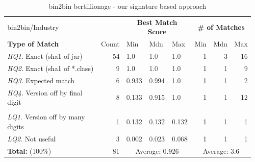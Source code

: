 \begin{table}[h]
  \centering
\begin{tabular}[htbp]{l|r|lll|rrr}
  bin2bin/Industry           &              & \multicolumn{3}{c|}{\textbf{Best Match Score}}  & \multicolumn{3}{c}{\textbf{\# of Matches}} \\
  \textbf{Type of Match}     & Count        & Min   & Mdn    & Max   & Min  & Mdn  & Max  \\
  \hline
  \emph{HQ1.} Exact (sha1 of jar)        & 54           & 1.0   & 1.0    & 1.0   & 1    & 3    & 16   \\
  \emph{HQ2.} Exact (sha1 of *.class)    &  9           & 1.0   & 1.0    & 1.0   & 1    & 1    &  9   \\
  \emph{HQ3.} Expected match             &  6           & 0.933 & 0.994  & 1.0   & 1    & 1    &  2   \\
  \emph{HQ4.} Version off by final digit &  8           & 0.133 & 0.915  & 1.0   & 1    & 1    & 12   \\
  & & & & & & & \\
  \emph{LQ1.} Version off by many digits &  1           & 0.132 & 0.132  & 0.132 & 1    & 1    &  1   \\
  \emph{LQ2.} Not useful                 &  3           & 0.002 & 0.023  & 0.068 & 1    & 1    &  1   \\
  \hline
  \textbf{Total:} \hspace{7.5em} (100\%) &  81   & \multicolumn{3}{c|}{Average: 0.926}  & \multicolumn{3}{c}{Average: 3.6} \\
\end{tabular}
  \caption{bin2bin bertillionage - our signature based approach}
  \label{tab:bankBin2Bin}
\end{table}


